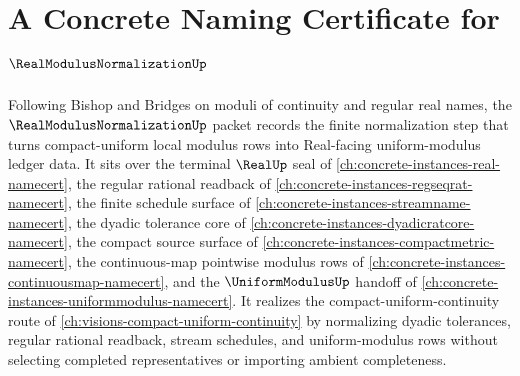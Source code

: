 \chapter{A Concrete Naming Certificate for $\RealModulusNormalizationUp$}
\label{ch:concrete-instances-real-modulus-normalization-namecert}

Following Bishop and Bridges on moduli of continuity and regular real names, the $\RealModulusNormalizationUp$ packet records the finite normalization step that turns compact-uniform local modulus rows into Real-facing uniform-modulus ledger data. It sits over the terminal $\RealUp$ seal of \autoref{ch:concrete-instances-real-namecert}, the regular rational readback of \autoref{ch:concrete-instances-regseqrat-namecert}, the finite schedule surface of \autoref{ch:concrete-instances-streamname-namecert}, the dyadic tolerance core of \autoref{ch:concrete-instances-dyadicratcore-namecert}, the compact source surface of \autoref{ch:concrete-instances-compactmetric-namecert}, the continuous-map pointwise modulus rows of \autoref{ch:concrete-instances-continuousmap-namecert}, and the $\UniformModulusUp$ handoff of \autoref{ch:concrete-instances-uniformmodulus-namecert}. It realizes the compact-uniform-continuity route of \autoref{ch:visions-compact-uniform-continuity} by normalizing dyadic tolerances, regular rational readback, stream schedules, and uniform-modulus rows without selecting completed representatives or importing ambient completeness.

